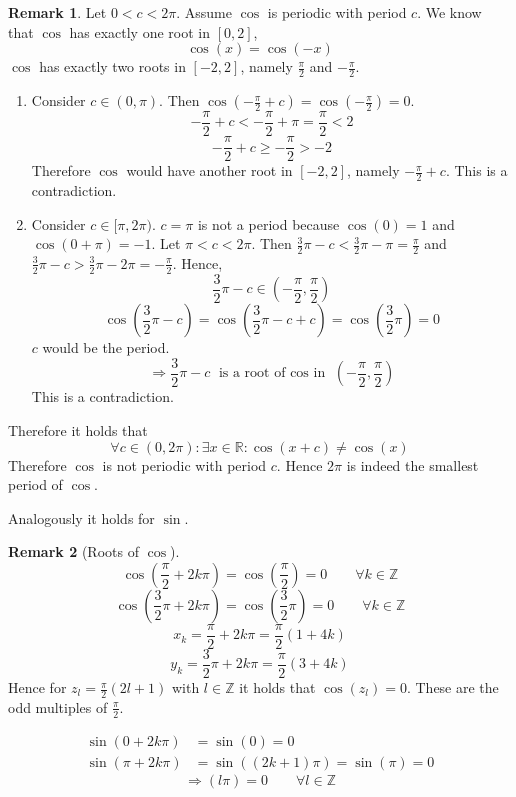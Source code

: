 \documentclass[a4paper,landscape,twocolumn]{article}
\theoremstyle{definition}
\newtheorem{rem}{Remark}
\begin{document}
\begin{rem}
  Let $0 < c < 2\pi$. Assume $\cos$ is periodic with period $c$.
  We know that $\cos$ has exactly one root in $[0,2]$,
  \[ \cos(x) = \cos(-x) \]
  $\cos$ has exactly two roots in $[-2,2]$, namely $\frac\pi2$ and $-\frac\pi2$.

  \begin{enumerate}
    \item Consider $c \in (0,\pi)$. Then $\cos\left(-\frac\pi2 + c\right) = \cos\left(-\frac\pi2\right) = 0$.
      \[ -\frac\pi2 + c < -\frac\pi2 + \pi = \frac\pi2 < 2 \]
      \[ -\frac\pi2 + c \geq -\frac\pi2 > -2 \]
      Therefore $\cos$ would have another root in $[-2,2]$, namely $-\frac\pi2 + c$.
      This is a contradiction.
    \item
      Consider $c \in [\pi,2\pi)$.
      $c = \pi$ is not a period because $\cos(0) = 1$ and $\cos(0 + \pi) = -1$.
      Let $\pi < c < 2\pi$.
      Then $\frac32 \pi - c < \frac32 \pi - \pi = \frac\pi2$ and $\frac32 \pi - c > \frac32 \pi - 2\pi = -\frac\pi2$.
      Hence,
      \[ \frac32 \pi - c \in \left(-\frac\pi2, \frac\pi2\right) \]
      \[ \cos\left(\frac32 \pi - c\right) = \cos\left(\frac32 \pi - c + c\right) = \cos\left(\frac32 \pi\right) = 0 \]
      $c$ would be the period.
      \[ \Rightarrow \frac32 \pi - c \text{ is a root of $\cos$ in } (-\frac\pi2, \frac\pi2) \]
      This is a contradiction.
  \end{enumerate}

  Therefore it holds that
  \[ \forall c \in (0,2\pi): \exists x \in \mathbb R: \cos(x + c) \neq \cos(x) \]
  Therefore $\cos$ is not periodic with period $c$.
  Hence $2\pi$ is indeed the smallest period of $\cos$.

  Analogously it holds for $\sin$.
\end{rem}

\begin{rem}[Roots of $\cos$]
  \[ \cos\left(\frac\pi2 + 2k\pi\right) = \cos\left(\frac\pi2\right) = 0 \qquad \forall k \in \mathbb Z \]
  \[ \cos\left(\frac32 \pi + 2k \pi\right) = \cos\left(\frac32 \pi\right) = 0 \qquad \forall k \in \mathbb Z \]
  \[ x_k = \frac\pi2 + 2k \pi = \frac{\pi}{2} \left(1 + 4k\right) \]
  \[ y_k = \frac32 \pi + 2k \pi = \frac\pi2 \left(3 + 4k\right) \]
  Hence for $z_l = \frac\pi2 \left(2l + 1\right)$ with $l \in \mathbb Z$ it holds that $\cos(z_l) = 0$.
  These are the odd multiples of $\frac\pi2$.

  \begin{align*}
    \sin(0 + 2k\pi) &= \sin(0) = 0 \\
    \sin(\pi + 2k\pi) &= \sin((2k + 1)\pi) = \sin(\pi) = 0
  \end{align*}
  \[ \Rightarrow (l\pi) = 0 \qquad \forall l \in \mathbb Z \]
\end{rem}
\end{document}
